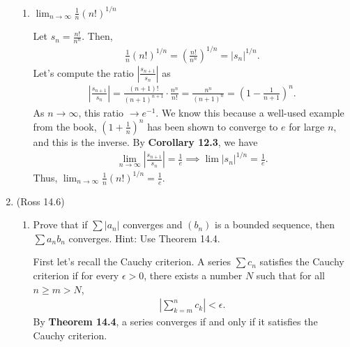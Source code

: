 \documentclass [10pt]{article}
\newcommand{\jg}[1]{{\color{blue} #1}}
\begin{document}
\begin{enumerate}
\begin{enumerate}
\item $\lim_{n \to \infty} \frac{1}{n}(n!)^{1/n}$

\jg{
Let $s_n = \frac{n!}{n^n}$. Then, 
\begin{align*}
    \frac{1}{n} (n!)^{1/n} = \left( \frac{n!}{n^n}\right)^{1/n} = |s_n|^{1/n}. 
\end{align*}
Let's compute the ratio $\left| \frac{s_{n+1}}{s_n} \right|$ as 
\begin{align*}
    \left| \frac{s_{n+1}}{s_n} \right| = \frac{(n+1)!}{(n+1)^{n+1}} \cdot \frac{n^n}{n!} = \frac{n^n}{(n+1)^n} = \left( 1 - \frac{1}{n+1}\right)^n. 
\end{align*}
As $n \rightarrow \infty$, this ratio $\rightarrow e^{-1}$. We know this because a well-used example from the book, $(1+\frac{1}{n})^n$ has been shown to converge to $e$ for large $n$, and this is the inverse. 
By \textbf{Corollary 12.3}, we have 
\begin{align*}
    \lim_{n \rightarrow \infty} \left| \frac{s_{n+1}}{s_n} \right|  = \frac{1}{e} \implies \lim |s_n|^{1/n} = \frac{1}{e}. 
\end{align*}
Thus, $\lim_{n \to \infty} \frac{1}{n}(n!)^{1/n} = \frac{1}{e}$.
}

\end{enumerate}


\clearpage
\item (Ross 14.6)
\begin{enumerate}
\item Prove that if $\sum\left|a_n\right|$ converges and $\left(b_n\right)$ is
a bounded sequence, then $\sum a_n b_n$ converges. Hint: Use Theorem 14.4.

\jg{
First let's recall the Cauchy criterion. A series $\sum c_n$ satisfies the Cauchy criterion if for every $\epsilon > 0$, there exists a number $N$ such that for all $n \geq m > N$, 
\begin{align*}
    \left| \sum_{k=m}^n c_k \right| < \epsilon.
\end{align*}
By \textbf{Theorem 14.4}, a series converges if and only if it satisfies the Cauchy criterion. 

}
\end{enumerate}
\end{enumerate}
\end{document}

